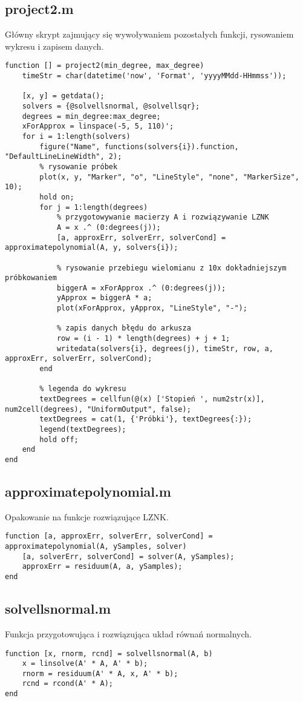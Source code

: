 \documentclass[12pt]{article}
\begin{document}
\subsection{project2.m}
Główny skrypt zajmujący się wywoływaniem pozostałych funkcji, rysowaniem wykresu i zapisem danych.
\begin{verbatim}
function [] = project2(min_degree, max_degree)
    timeStr = char(datetime('now', 'Format', 'yyyyMMdd-HHmmss'));

    [x, y] = getdata();
    solvers = {@solvellsnormal, @solvellsqr};
    degrees = min_degree:max_degree;
    xForApprox = linspace(-5, 5, 110)';
    for i = 1:length(solvers)
        figure("Name", functions(solvers{i}).function, "DefaultLineLineWidth", 2);
        % rysowanie próbek
        plot(x, y, "Marker", "o", "LineStyle", "none", "MarkerSize", 10);
        hold on;
        for j = 1:length(degrees)
            % przygotowywanie macierzy A i rozwiązywanie LZNK
            A = x .^ (0:degrees(j));
            [a, approxErr, solverErr, solverCond] = approximatepolynomial(A, y, solvers{i});

            % rysowanie przebiegu wielomianu z 10x dokładniejszym próbkowaniem
            biggerA = xForApprox .^ (0:degrees(j));
            yApprox = biggerA * a;
            plot(xForApprox, yApprox, "LineStyle", "-");

            % zapis danych błędu do arkusza
            row = (i - 1) * length(degrees) + j + 1;
            writedata(solvers{i}, degrees(j), timeStr, row, a, approxErr, solverErr, solverCond);
        end

        % legenda do wykresu
        textDegrees = cellfun(@(x) ['Stopień ', num2str(x)], num2cell(degrees), "UniformOutput", false);
        textDegrees = cat(1, {'Próbki'}, textDegrees{:});
        legend(textDegrees);
        hold off;
    end
end
\end{verbatim}

\subsection{approximatepolynomial.m}
Opakowanie na funkcje rozwiązujące LZNK.
\begin{verbatim}
function [a, approxErr, solverErr, solverCond] = approximatepolynomial(A, ySamples, solver)
    [a, solverErr, solverCond] = solver(A, ySamples);
    approxErr = residuum(A, a, ySamples);
end
\end{verbatim}

\subsection{solvellsnormal.m}
Funkcja przygotowująca i rozwiązująca układ równań normalnych.
\begin{verbatim}
function [x, rnorm, rcnd] = solvellsnormal(A, b)
    x = linsolve(A' * A, A' * b);
    rnorm = residuum(A' * A, x, A' * b);
    rcnd = rcond(A' * A);
end
\end{verbatim}
\end{document}
